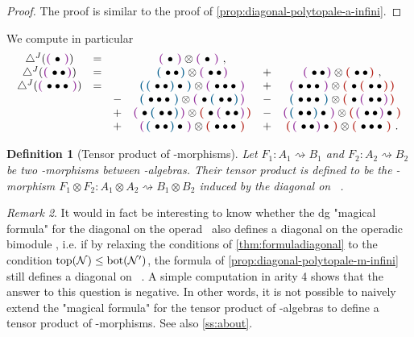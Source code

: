 \documentclass[twoside, 11pt]{amsart}
\newtheorem{definition}{Definition}[section]
\theoremstyle{remark}
\newtheorem{remark}[definition]{\sc Remark}
\begin{document}
\begin{proof}
The proof is similar to the proof of \cref{prop:diagonal-polytopale-a-infini}. 
\end{proof}

We compute in particular 
\[
\begin{matrix}
\diagminf ( \purple{ \bullet } )  
&=&  & \purple{ \bullet } \otimes \purple{ \bullet } \ , & &  \\
\diagminf ( \purple{ \bullet \bullet } ) 
&=& & \blue{\bullet \bullet} \otimes \purple{\bullet \bullet} & + & \purple{\bullet \bullet} \otimes \red{\bullet \bullet} \ , \\
\diagminf (\purple{\bullet \bullet \bullet}) 
&=& 
& \blue{\blue{\bullet \bullet}\bullet} \otimes \purple{\bullet \bullet \bullet} 
& + & \purple{\bullet \bullet \bullet} \otimes \red{\bullet \red{\bullet \bullet}} \\
& &- &  \blue{\bullet \bullet \bullet} \otimes \purple{\bullet \blue{\bullet \bullet}}    &  - & \blue{\bullet \bullet \bullet} \otimes \red{\bullet \purple{\bullet \bullet}}  \\  &   &+ & \purple{\bullet \blue{\bullet \bullet}} \otimes \red{\bullet \purple{\bullet \bullet}} 
  &  - & \purple{\blue{\bullet \bullet} \bullet} \otimes \red{\purple{\bullet \bullet} \bullet} \\ & &  + & \purple{\blue{\bullet \bullet} \bullet} \otimes \red{\bullet \bullet \bullet}   &  + & \red{\purple{\bullet \bullet} \bullet} \otimes \red{\bullet \bullet \bullet} \ .
  \end{matrix}
\]

\begin{definition}[Tensor product of \Ainf -morphisms] \label{def:tensor-ainf-morph}
Let $F_1 : A_1 \rightsquigarrow B_1$ and $F_2 : A_2 \rightsquigarrow B_2$ be two \Ainf -morphisms between \Ainf-algebras.
Their tensor product is defined to be the \Ainf -morphism $F_1 \otimes F_2 : A_1 \otimes A_2 \rightsquigarrow B_1 \otimes B_2$ induced by the diagonal \diagminf on \Minf \ .
\end{definition}

\begin{remark} \label{rmk:non-a-topbot}
It would in fact be interesting to know whether the dg "magical formula" for the diagonal on the operad \Ainf\
also defines a diagonal on the operadic bimodule \Minf, i.e. if by relaxing the conditions of \cref{thm:formuladiagonal} to the condition $\operatorname{top}(\mathcal{N}) \leq \operatorname{bot}(\mathcal{N'})$, the formula of \cref{prop:diagonal-polytopale-m-infini} still defines a diagonal on \Minf \ . A simple computation in arity 4 shows that the answer to this question is negative. In other words, it is not possible to naively extend the "magical formula" for the tensor product of \Ainf -algebras to define a tensor product of \Ainf -morphisms. See also \cref{ss:about}.
\end{remark}
\end{document}
